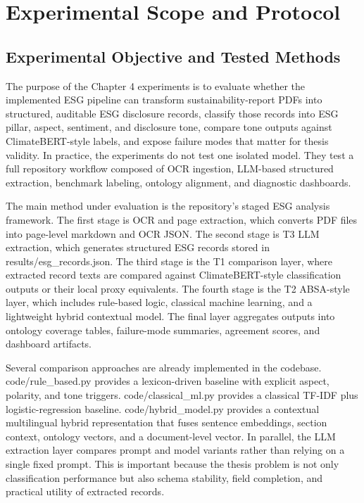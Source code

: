 \section{Experimental Scope and Protocol}

\subsection{Experimental Objective and Tested Methods}

The purpose of the Chapter 4 experiments is to evaluate whether the implemented ESG pipeline can transform sustainability-report PDFs into structured, auditable ESG disclosure records, classify those records into ESG pillar, aspect, sentiment, and disclosure tone, compare tone outputs against ClimateBERT-style labels, and expose failure modes that matter for thesis validity. In practice, the experiments do not test one isolated model. They test a full repository workflow composed of OCR ingestion, LLM-based structured extraction, benchmark labeling, ontology alignment, and diagnostic dashboards.

The main method under evaluation is the repository’s staged ESG analysis framework. The first stage is OCR and page extraction, which converts PDF files into page-level markdown and OCR JSON. The second stage is T3 LLM extraction, which generates structured ESG records stored in results/esg\_records.json. The third stage is the T1 comparison layer, where extracted record texts are compared against ClimateBERT-style classification outputs or their local proxy equivalents. The fourth stage is the T2 ABSA-style layer, which includes rule-based logic, classical machine learning, and a lightweight hybrid contextual model. The final layer aggregates outputs into ontology coverage tables, failure-mode summaries, agreement scores, and dashboard artifacts.

Several comparison approaches are already implemented in the codebase. code/rule\_based.py provides a lexicon-driven baseline with explicit aspect, polarity, and tone triggers. code/classical\_ml.py provides a classical TF-IDF plus logistic-regression baseline. code/hybrid\_model.py provides a contextual multilingual hybrid representation that fuses sentence embeddings, section context, ontology vectors, and a document-level vector. In parallel, the LLM extraction layer compares prompt and model variants rather than relying on a single fixed prompt. This is important because the thesis problem is not only classification performance but also schema stability, field completion, and practical utility of extracted records.

